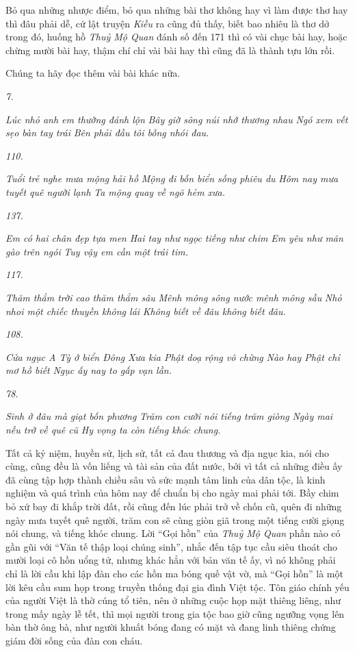 \documentclass[../main.tex]{subfiles}
\begin{document}
\begin{multicols}{2}
Bỏ qua những nhược điểm, bỏ qua những bài thơ không hay vì làm được thơ hay thì đâu phải dễ, cứ lật truyện\textit{ Kiều} ra cũng đủ thấy, biết bao nhiêu là thơ dở trong đó, huống hồ \textit{Thuỷ Mộ Quan} đánh số đến 171 thì có vài chục bài hay, hoặc chừng mười bài hay, thậm chí chỉ vài bài hay thì cũng đã là thành tựu lớn rồi. 

Chúng ta hãy đọc thêm vài bài khác nữa. 

\textit{7.} 

\textit{Lúc nhỏ anh em thường đánh lộn} 
\textit{Bây giờ sông núi nhớ thương nhau} 
\textit{Ngó xem vết sẹo bàn tay trái} 
\textit{Bên phải đầu tôi bỗng nhói đau.} 

\textit{110.} 

\textit{Tuổi trẻ nghe mưa mộng hải hồ} 
\textit{Mộng đi bốn biển sống phiêu du} 
\textit{Hôm nay mưa tuyết quê người lạnh} 
\textit{Ta mộng quay về ngõ hẻm xưa.} 

\textit{137.} 

\textit{Em có hai chân đẹp tựa men} 
\textit{Hai tay như ngọc tiếng như chim} 
\textit{Em yêu như mãn gào trên ngói} 
\textit{Tuy vậy em cần một trái tim.} 

\textit{117.} 

\textit{Thăm thẳm trời cao thăm thẳm sâu} 
\textit{Mênh mông sông nước mênh mông sầu} 
\textit{Nhỏ nhoi một chiếc thuyền không lái} 
\textit{Không biết về đâu không biết đâu.} 

\textit{108.} 

\textit{Cửa ngục A Tỳ ở biển Đông} 
\textit{Xưa kia Phật doạ rộng vô chừng} 
\textit{Nào hay Phật chỉ mơ hồ biết} 
\textit{Ngục ấy nay to gấp vạn lần.} 

\textit{78.} 

\textit{Sinh ở đâu mà giạt bốn phương} 
\textit{Trăm con cười nói tiếng trăm giòng} 
\textit{Ngày mai nếu trở về quê cũ} 
\textit{Hy vọng ta còn tiếng khóc chung.} 

Tất cả kỷ niệm, huyền sử, lịch sử, tất cả đau thương và địa ngục kia, nói cho cùng, cũng đều là vốn liếng và tài sản của đất nước, bởi vì tất cả những điều ấy đã cùng tập hợp thành chiều sâu và sức mạnh tâm linh của dân tộc, là kinh nghiệm và quá trình của hôm nay để chuẩn bị cho ngày mai phải tới. Bầy chim bỏ xứ bay đi khắp trời đất, rồi cũng đến lúc phải trở về chốn cũ, quên đi những ngày mưa tuyết quê người, trăm con sẽ cùng giòn giã trong một tiếng cười giọng nói chung, và tiếng khóc chung. Lời “Gọi hồn” của \textit{Thuỷ Mộ Quan} phần nào có gần gũi với “Văn tế thập loại chúng sinh”, nhắc đến tập tục cầu siêu thoát cho mười loại cô hồn uổng tử, nhưng khác hẳn với bản văn tế ấy, vì nó không phải chỉ là lời cầu khi lập đàn cho các hồn ma bóng quế vật vờ, mà “Gọi hồn” là một lời kêu cầu sum họp trong truyền thống đại gia đình Việt tộc. Tôn giáo chính yếu của người Việt là thờ cúng tổ tiên, nên ở những cuộc họp mặt thiêng liêng, như trong mấy ngày lễ tết, thì mọi người trong gia tộc bao giờ cũng ngưỡng vọng lên bàn thờ ông bà, như người khuất bóng đang có mặt và đang linh thiêng chứng giám đời sống của đàn con cháu. 


\end{multicols}
\end{document}
